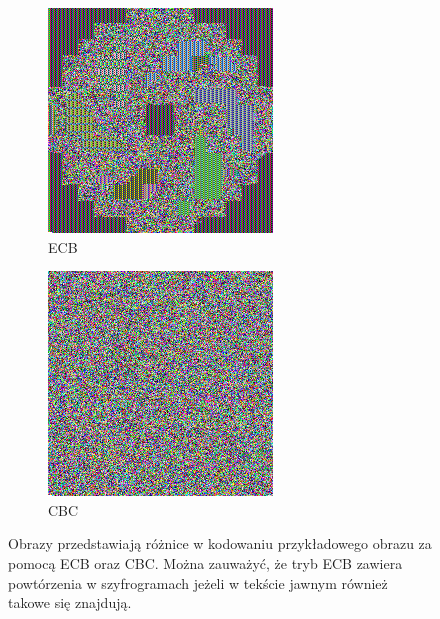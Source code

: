 \documentclass[a4paper,11pt]{article}
\theoremstyle{mytheor}
\begin{document}
\begin{figure}[]
\begin{subfigure}{0.33\textwidth}
        \includegraphics[width=1.0\linewidth]{logo_des_ecb.png}
        \caption{ECB}
        \label{fig:ecb}
    \end{subfigure}
    \begin{subfigure}{0.33\textwidth}
        \includegraphics[width=1.0\linewidth]{logo_des_cbc.png}
        \caption{CBC}
        \label{fig:cbc}
    \end{subfigure}

    \caption{Obrazy przedstawiają różnice w kodowaniu przykładowego obrazu za pomocą ECB oraz CBC. Można zauważyć, że tryb ECB zawiera powtórzenia w szyfrogramach jeżeli w tekście jawnym również takowe się znajdują.}
    \label{fig:compare}
\end{figure}
\end{document}
